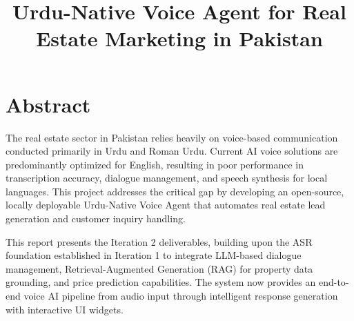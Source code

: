 \documentclass{fast-nuces-bs}
\title{Urdu-Native Voice Agent for Real Estate Marketing in Pakistan}
\begin{document}
\chapter*{Abstract}

The real estate sector in Pakistan relies heavily on voice-based communication conducted primarily in Urdu and Roman Urdu. Current AI voice solutions are predominantly optimized for English, resulting in poor performance in transcription accuracy, dialogue management, and speech synthesis for local languages. This project addresses the critical gap by developing an open-source, locally deployable Urdu-Native Voice Agent that automates real estate lead generation and customer inquiry handling.

This report presents the Iteration 2 deliverables, building upon the ASR foundation established in Iteration 1 to integrate LLM-based dialogue management, Retrieval-Augmented Generation (RAG) for property data grounding, and price prediction capabilities. The system now provides an end-to-end voice AI pipeline from audio input through intelligent response generation with interactive UI widgets.












% 
\end{document}
